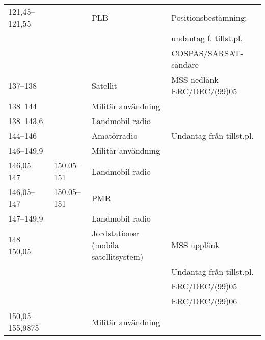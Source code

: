\begin{landscape}
\begin{longtable}{llll}
	121,45--121,55                         &                    & PLB                                   & Positionsbestämning;           \\
	                                       &                    &                                       & undantag f. tillst.pl.         \\
	                                       &                    &                                       & COSPAS/SARSAT-sändare          \\
	137--138                               &                    & Satellit                              & MSS nedlänk ERC/DEC/(99)05     \\
	138--144                               &                    & Militär användning                    &  \\
	138--143,6                             &                    & Landmobil radio                       &  \\
	144--146                               &                    & Amatörradio                           & Undantag från tillst.pl.       \\
	146--149,9                             &                    & Militär användning                    &  \\
	146,05--147                            & 150.05--151        & Landmobil radio                       &  \\
	146,05--147                            & 150.05--151        & PMR                                   &  \\
	147--149,9                             &                    & Landmobil radio                       &  \\
	148--150,05                            &                    & Jordstationer (mobila satellitsystem) & MSS upplänk                    \\
	                                       &                    &                                       & Undantag från tillst.pl.       \\
	                                       &                    &                                       & ERC/DEC/(99)05                 \\
	                                       &                    &                                       & ERC/DEC/(99)06                 \\
	150,05--155,9875                       &                    & Militär användning                    &  \\

\end{longtable}
\end{landscape}
